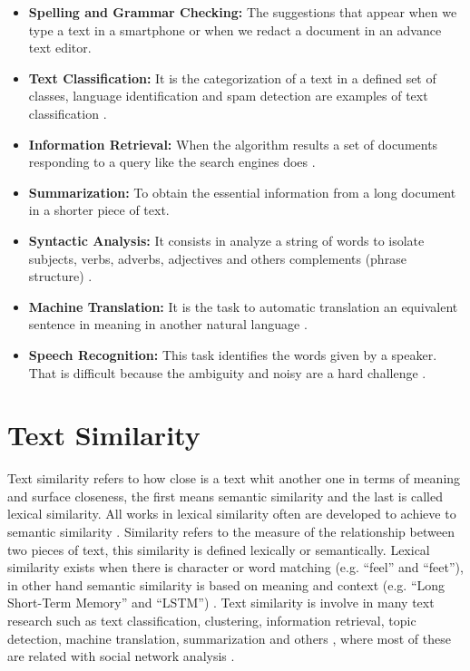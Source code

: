 \documentclass[12pt]{report}
\begin{document}
\begin{itemize}[nolistsep]
	\item \textbf{Spelling and Grammar Checking:} The suggestions that appear when we type a text in a smartphone or when we redact a document in an advance text editor. 
	
	\item \textbf{Text Classification:} It is the categorization of a text in a defined set of classes, language identification and spam detection are examples of text classification \cite{Russell2010}.
	
	\item \textbf{Information Retrieval:} When the algorithm results a set of documents responding to a query like the search engines does \cite{Russell2010}.
	
	\item \textbf{Summarization:} To obtain the essential information from a long document in a shorter piece of text.
	
	\item \textbf{Syntactic Analysis:} It consists in analyze a string of words to isolate subjects, verbs, adverbs, adjectives and others complements (phrase structure) \cite{Russell2010}.
	
	\item \textbf{Machine Translation:} It is the task to automatic translation an equivalent sentence in meaning in another natural language \cite{Goodfellow2016}.
	
	\item \textbf{Speech Recognition:} This task identifies the words given by a speaker. That is difficult because the ambiguity and noisy are a hard challenge \cite{Russell2010}.
	
\end{itemize}

\section{Text Similarity}
Text similarity refers to how close is a text whit another one in terms of meaning and surface closeness, the first means semantic similarity and the last is called lexical similarity. All works in lexical similarity often are developed to achieve to semantic similarity \cite{Ganesan2015}. Similarity refers to the measure of the relationship between two pieces of text, this similarity is defined lexically or semantically. Lexical similarity exists when there is character or word matching (e.g. ``feel'' and ``feet''), in other hand semantic similarity is based on meaning and context (e.g. ``Long Short-Term Memory'' and ``\ac{LSTM}'') \cite{Pradhan2015}. 
Text similarity is involve in many text research such as text classification, clustering, information retrieval, topic detection, machine translation, summarization and others \cite{Majumder2016} \cite{Gomaa2013} \cite{Pradhan2015}, where most of these are related with social network analysis \cite{Zhang2015}.  
\end{document}
